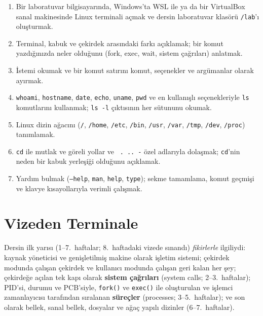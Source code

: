 \documentclass[11pt,a4paper]{article}
\newcommand{\term}[1]{\textbf{\color{mintdeep}#1}}
\newcommand{\cmd}[1]{\texttt{#1}}
\begin{document}
\vspace{0.8em}
\begin{keyidea}
\begin{enumerate}[leftmargin=1.4em]
  \item Bir laboratuvar bilgisayarında, Windows'ta WSL ile ya da bir VirtualBox sanal makinesinde Linux terminali açmak ve dersin laboratuvar klasörü \texttt{\tl/lab}'ı oluşturmak.
  \item Terminal, kabuk ve çekirdek arasındaki farkı açıklamak; bir komut yazdığınızda neler olduğunu (fork, exec, wait, sistem çağrıları) anlatmak.
  \item İstemi okumak ve bir komut satırını komut, seçenekler ve argümanlar olarak ayırmak.
  \item \cmd{whoami}, \cmd{hostname}, \cmd{date}, \cmd{echo}, \cmd{uname}, \cmd{pwd} ve en kullanışlı seçenekleriyle \cmd{ls} komutlarını kullanmak; \cmd{ls -l} çıktısının her sütununu okumak.
  \item Linux dizin ağacını (\texttt{/}, \texttt{/home}, \texttt{/etc}, \texttt{/bin}, \texttt{/usr}, \texttt{/var}, \texttt{/tmp}, \texttt{/dev}, \texttt{/proc}) tanımlamak.
  \item \cmd{cd} ile mutlak ve göreli yollar ve \texttt{\tl}\ \texttt{.}\ \texttt{..}\ \texttt{-} özel adlarıyla dolaşmak; \cmd{cd}'nin neden bir kabuk yerleşiği olduğunu açıklamak.
  \item Yardım bulmak (\cmd{--help}, \cmd{man}, \cmd{help}, \cmd{type}); sekme tamamlama, komut geçmişi ve klavye kısayollarıyla verimli çalışmak.
\end{enumerate}
\end{keyidea}

\setcounter{tocdepth}{1}
\tableofcontents

\section{Vizeden Terminale}

Dersin ilk yarısı (1--7.\ haftalar; 8.\ haftadaki vizede sınandı) \emph{fikirlerle} ilgiliydi: kaynak yöneticisi ve genişletilmiş makine olarak işletim sistemi; çekirdek modunda çalışan çekirdek ve kullanıcı modunda çalışan geri kalan her şey; çekirdeğe açılan tek kapı olarak \term{sistem çağrıları} (system calls; 2--3.\ haftalar); PID'si, durumu ve PCB'siyle, \cmd{fork()} ve \cmd{exec()} ile oluşturulan ve işlemci zamanlayıcısı tarafından sıralanan \term{süreçler} (processes; 3--5.\ haftalar); ve son olarak bellek, sanal bellek, dosyalar ve ağaç yapılı dizinler (6--7.\ haftalar).
\end{document}
